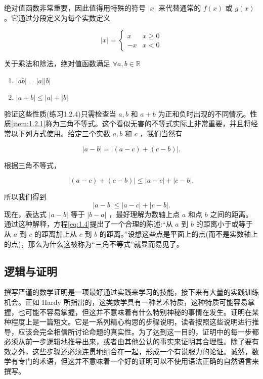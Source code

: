\begin{Eg}[三角不等式]
  \label{eg:1.2.5}
绝对值函数非常重要，因此值得用特殊的符号 \(\left| x\right|\) 来代替通常的 \(f\left( x\right)\) 或 \(g\left( x\right)\) 。它通过分段定义为每个实数定义

\[
\left| x\right|  = \left\{  \begin{array}{ll} x & x \geq  0 \\   - x & x < 0 \end{array}\right.
\]

关于乘法和除法，绝对值函数满足 $\forall a,b\in \mathbb{R}$
\begin{enumerate}
\item \(\left| {ab}\right|  = \left| a\right| \left| b\right|\) 
\item \label{item:1.2.1}    \(\left| {a + b}\right|  \leq  \left| a\right|  + \left| b\right|\)
\end{enumerate}

验证这些性质(练习1.2.4)只需检查当 \(a,b\) 和 \(a + b\) 为正和负时出现的不同情况。性质\ref{item:1.2.1}称为三角不等式。这个看似无害的不等式实际上非常重要，并且将经常以下列方式使用。给定三个实数 \(a,b\) 和 \(c\) ，我们当然有

\[
\left| {a - b}\right|  = \left| {\left( {a - c}\right)  + \left( {c - b}\right) }\right| .
\]

根据三角不等式，

\[
\left| {\left( {a - c}\right)  + \left( {c - b}\right) }\right|  \leq  \left| {a - c}\right|  + \left| {c - b}\right| ,
\]

所以我们得到
\begin{equation}
\label{eq:1.4}
\left| {a - b}\right|  \leq  \left| {a - c}\right|  + \left| {c - b}\right| .
\end{equation}
现在，表达式 \(\left| {a - b}\right|\) 等于 \(\left| {b - a}\right|\) ，最好理解为数轴上点 \(a\) 和点 \(b\) 之间的距离。通过这种解释，方程\eqref{eq:1.4}提出了一个合理的陈述:“从 \(a\) 到 \(b\) 的距离小于或等于从 \(a\) 到 \(c\) 的距离加上从 \(c\) 到 \(b\) 的距离。”设想这些点是平面上的点(而不是实数轴上的点)，那么为什么这被称为“三角不等式”就显而易见了。
\end{Eg}

\subsection{逻辑与证明}
撰写严谨的数学证明是一项最好通过实践来学习的技能，接下来有大量的实践训练机会。正如 Hardy 所指出的，这类数学具有一种艺术特质，这种特质可能容易掌握，也可能不容易掌握，但这并不意味着有什么特别神秘的事情在发生。证明在某种程度上是一篇短文。它是一系列精心构思的步骤说明，读者按照这些说明进行推导，应该会完全相信所讨论命题的真实性。为了达到这一目的，证明中的每一步都必须从前一步逻辑地推导出来，或者由其他公认的事实来证明其合理性。除了要有效之外，这些步骤还必须连贯地组合在一起，形成一个有说服力的论证。诚然，数学有专门的术语，但这并不意味着一个好的证明可以不使用语法正确的自然语言来撰写。

